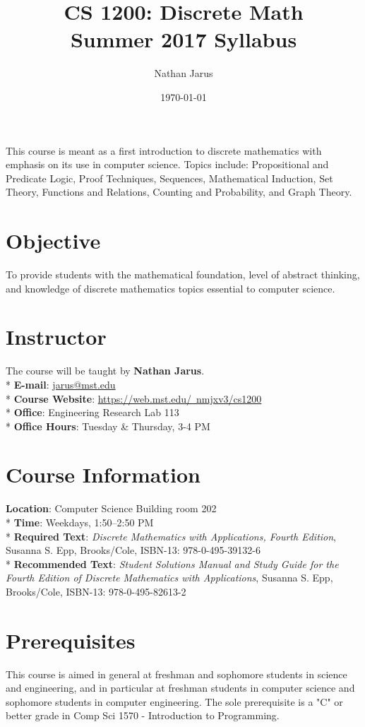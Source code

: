 \documentclass{article}
\title{CS 1200: Discrete Math \\ Summer 2017 Syllabus}
\date{\today}
\author{Nathan Jarus}
\begin{document}
\maketitle

This course is meant as a first introduction to discrete mathematics with emphasis on its use in computer science. Topics include: Propositional and Predicate Logic, Proof Techniques, Sequences, Mathematical Induction, Set Theory, Functions and Relations, Counting and Probability, and Graph Theory.

\section{Objective}

To provide students with the mathematical foundation, level of abstract thinking, and knowledge of discrete mathematics topics essential to computer science.

\section{Instructor}
The course will be taught by \textbf{Nathan Jarus}. \\*
\textbf{E-mail}: \href{mailto:jarus@mst.edu}{jarus@mst.edu} \\*
\textbf{Course Website}: \href{https://web.mst.edu/~nmjxv3/cs1200}{https://web.mst.edu/~nmjxv3/cs1200} \\*
\textbf{Office}: Engineering Research Lab 113 \\*
\textbf{Office Hours}: Tuesday \& Thursday, 3-4 PM\\

\section{Course Information}
\textbf{Location}: Computer Science Building room 202\\*
\textbf{Time}: Weekdays, 1:50--2:50 PM\\*
\textbf{Required Text}: \textit{Discrete Mathematics with Applications, Fourth Edition}, Susanna S. Epp, Brooks/Cole, ISBN-13: 978-0-495-39132-6\\*
\textbf{Recommended Text}: \textit{Student Solutions Manual and Study Guide for the Fourth Edition of Discrete Mathematics with Applications}, Susanna S. Epp, Brooks/Cole, ISBN-13: 978-0-495-82613-2\\

\section{Prerequisites}
This course is aimed in general at freshman and sophomore students in science and engineering, and in particular at freshman students in computer science and sophomore students in computer engineering. The sole prerequisite is a "C" or better grade in Comp Sci 1570 - Introduction to Programming.
\end{document}
